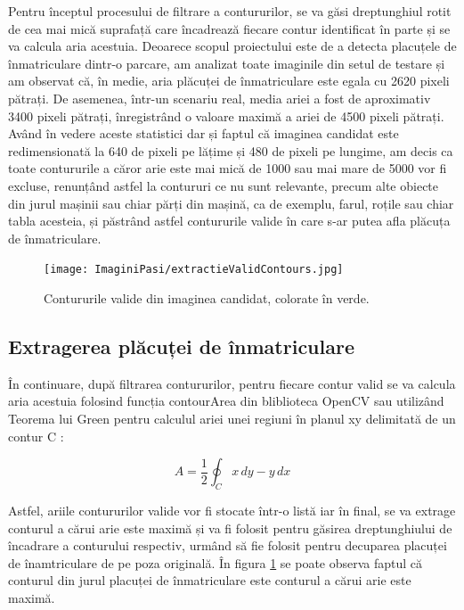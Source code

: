 \documentclass[12pt]{article}
\begin{document}
Pentru \^{i}nceptul procesului de filtrare a contururilor, se va g\u{a}si dreptunghiul rotit de cea mai mic\u{a} suprafaț\u{a} care \^{i}ncadreaz\u{a} fiecare contur identificat \^{i}n parte și se va calcula aria acestuia. Deoarece scopul proiectului este de a detecta placuțele de \^{i}nmatriculare dintr-o parcare, am analizat toate imaginile din setul de testare și am observat c\u{a}, \^{i}n medie, aria pl\u{a}cuței de \^{i}nmatriculare este egala cu 2620 pixeli p\u{a}trați. De asemenea, \^{i}ntr-un scenariu real, media ariei a fost de aproximativ 3400 pixeli p\u{a}trați, \^{i}nregistr\^{a}nd o valoare maxim\u{a} a ariei de 4500 pixeli p\u{a}trați. Av\^{a}nd \^{i}n vedere aceste statistici dar și faptul c\u{a} imaginea candidat este redimensionat\u{a} la 640 de pixeli pe l\u{a}țime și 480 de pixeli pe lungime, am decis ca toate contururile a c\u{a}ror arie este mai mic\u{a} de 1000 sau mai mare de 5000 vor fi excluse, renunț\^{a}nd astfel la contururi ce nu sunt relevante, precum alte obiecte din jurul mașinii sau chiar p\u{a}rți din mașin\u{a}, ca de exemplu, farul, roțile sau chiar tabla acesteia, și p\u{a}str\^{a}nd astfel contururile valide \^{i}n care s-ar putea afla pl\u{a}cuța de \^{i}nmatriculare.

\begin{figure}[H]
  \centering
  \texttt{[image: ImaginiPasi/extractieValidContours.jpg]}
  \caption{Contururile valide din imaginea candidat, colorate \^{i}n verde.}
  \label{fig:extractie_valid_contours}
\end{figure}

\subsection{Extragerea pl\u{a}cuței de \^{i}nmatriculare}

\^{I}n continuare, dup\u{a} filtrarea contururilor, pentru fiecare contur valid se va calcula aria acestuia folosind funcția contourArea din bliblioteca OpenCV sau utiliz\^{a}nd Teorema lui Green pentru calculul ariei unei regiuni \^{i}n planul xy delimitat\u{a} de un contur C \cite{green}:

\begin{equation}
A = \frac{1}{2} \oint_C x \, dy - y \, dx
\end{equation}

Astfel, ariile contururilor valide vor fi stocate \^{i}ntr-o list\u{a} iar \^{i}n final, se va extrage conturul a c\u{a}rui arie este maxim\u{a} și va fi folosit pentru g\u{a}sirea dreptunghiului de \^{i}ncadrare a conturului respectiv, urm\^{a}nd s\u{a} fie folosit pentru decuparea placuței de \^{i}namtriculare de pe poza original\u{a}. \^{I}n figura \ref{fig:extractie_valid_contours} se poate observa faptul c\u{a} conturul din jurul placuței de \^{i}nmatriculare este conturul a c\u{a}rui arie este maxim\u{a}.
\end{document}
